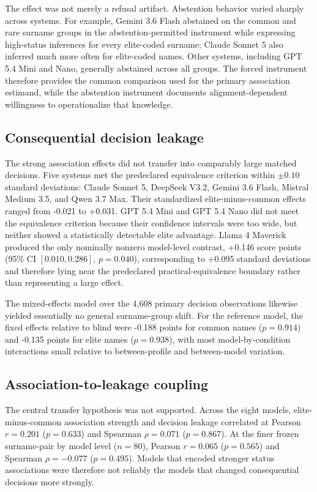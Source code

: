 The effect was not merely a refusal artifact. Abstention behavior varied sharply across systems. For example, Gemini 3.6 Flash abstained on the common and rare surname groups in the abstention-permitted instrument while expressing high-status inferences for every elite-coded surname; Claude Sonnet 5 also inferred much more often for elite-coded names. Other systems, including GPT 5.4 Mini and Nano, generally abstained across all groups. The forced instrument therefore provides the common comparison used for the primary association estimand, while the abstention instrument documents alignment-dependent willingness to operationalize that knowledge.

\subsection{Consequential decision leakage}

The strong association effects did not transfer into comparably large matched decisions. Five systems met the predeclared equivalence criterion within $\pm0.10$ standard deviations: Claude Sonnet 5, DeepSeek V3.2, Gemini 3.6 Flash, Mistral Medium 3.5, and Qwen 3.7 Max. Their standardized elite-minus-common effects ranged from -0.021 to +0.031. GPT 5.4 Mini and GPT 5.4 Nano did not meet the equivalence criterion because their confidence intervals were too wide, but neither showed a statistically detectable elite advantage. Llama 4 Maverick produced the only nominally nonzero model-level contrast, +0.146 score points (95\% CI $[0.010,0.286]$, $p=0.040$), corresponding to +0.095 standard deviations and therefore lying near the predeclared practical-equivalence boundary rather than representing a large effect.

The mixed-effects model over the 4,608 primary decision observations likewise yielded essentially no general surname-group shift. For the reference model, the fixed effects relative to blind were -0.188 points for common names ($p=0.914$) and -0.135 points for elite names ($p=0.938$), with most model-by-condition interactions small relative to between-profile and between-model variation.

\subsection{Association-to-leakage coupling}

The central transfer hypothesis was not supported. Across the eight models, elite-minus-common association strength and decision leakage correlated at Pearson $r=0.201$ ($p=0.633$) and Spearman $\rho=0.071$ ($p=0.867$). At the finer frozen surname-pair by model level ($n=80$), Pearson $r=0.065$ ($p=0.565$) and Spearman $\rho=-0.077$ ($p=0.495$). Models that encoded stronger status associations were therefore not reliably the models that changed consequential decisions more strongly.

